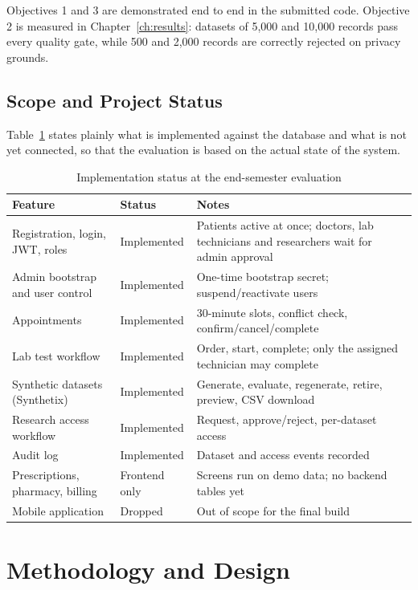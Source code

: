 \documentclass{tietreport}
\begin{document}
Objectives 1 and 3 are demonstrated end to end in the submitted code.
Objective 2 is measured in Chapter~\ref{ch:results}: datasets of 5,000 and
10,000 records pass every quality gate, while 500 and 2,000 records are
correctly rejected on privacy grounds.

\section{Scope and Project Status}

Table~\ref{tab:status} states plainly what is implemented against the
database and what is not yet connected, so that the evaluation is based on
the actual state of the system.

\begin{table}[H]
\centering
\small
\begin{tabular}{p{4.3cm}p{2.3cm}p{6.2cm}}
\toprule
\textbf{Feature} & \textbf{Status} & \textbf{Notes} \\
\midrule
Registration, login, JWT, roles & Implemented & Patients active at once; doctors, lab technicians and researchers wait for admin approval \\
Admin bootstrap and user control & Implemented & One-time bootstrap secret; suspend/reactivate users \\
Appointments & Implemented & 30-minute slots, conflict check, confirm/cancel/complete \\
Lab test workflow & Implemented & Order, start, complete; only the assigned technician may complete \\
Synthetic datasets (Synthetix) & Implemented & Generate, evaluate, regenerate, retire, preview, CSV download \\
Research access workflow & Implemented & Request, approve/reject, per-dataset access \\
Audit log & Implemented & Dataset and access events recorded \\
Prescriptions, pharmacy, billing & Frontend only & Screens run on demo data; no backend tables yet \\
Mobile application & Dropped & Out of scope for the final build \\
\bottomrule
\end{tabular}
\caption{Implementation status at the end-semester evaluation}
\label{tab:status}
\end{table}


\chapter{Methodology and Design}
\end{document}
